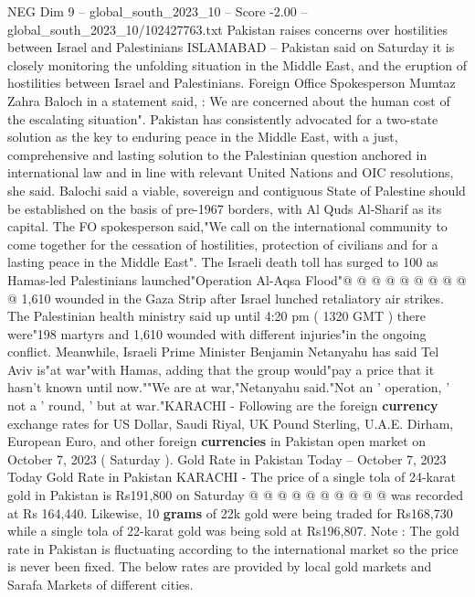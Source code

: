 \begin{textsample}{NEG Dim 9 – global\_south\_2023\_10 – Score -2.00 – global\_south\_2023\_10/102427763.txt}  \label{ex:f9_neg_418}
Pakistan raises concerns over hostilities between Israel and Palestinians ISLAMABAD -- Pakistan said on Saturday it is closely monitoring the unfolding situation in the Middle East, and the eruption of hostilities between Israel and Palestinians.
Foreign Office Spokesperson Mumtaz Zahra Baloch in a statement said, : We are concerned about the human cost of the escalating situation".
Pakistan has consistently advocated for a two-state solution as the key to enduring peace in the Middle East, with a just, comprehensive and lasting solution to the Palestinian question anchored in international law and in line with relevant United Nations and OIC resolutions, she said.
Balochi said a viable, sovereign and contiguous State of Palestine should be established on the basis of pre-1967 borders, with Al Quds Al-Sharif as its capital.
The FO spokesperson said,"We call on the international community to come together for the cessation of hostilities, protection of civilians and for a lasting peace in the Middle East".
The Israeli death toll has surged to 100 as Hamas-led Palestinians launched"Operation Al-Aqsa Flood"@ @ @ @ @ @ @ @ @ @ 1,610 wounded in the Gaza Strip after Israel lunched retaliatory air strikes.
The Palestinian health ministry said up until 4:20 pm ( 1320 GMT ) there were"198 martyrs and 1,610 wounded with different injuries"in the ongoing conflict.
Meanwhile, Israeli Prime Minister Benjamin Netanyahu has said Tel Aviv is"at war"with Hamas, adding that the group would"pay a price that it hasn't known until now.""We are at war,"Netanyahu said."Not an ' operation, ' not a ' round, ' but at war."KARACHI - Following are the foreign \textbf{currency} exchange rates for US Dollar, Saudi Riyal, UK Pound Sterling, U.A.E.
Dirham, European Euro, and other foreign \textbf{currencies} in Pakistan open market on October 7, 2023 ( Saturday ).
Gold Rate in Pakistan Today -- October 7, 2023 Today Gold Rate in Pakistan KARACHI - The price of a single tola of 24-karat gold in Pakistan is Rs191,800 on Saturday @ @ @ @ @ @ @ @ @ @ was recorded at Rs 164,440.
Likewise, 10 \textbf{grams} of 22k gold were being traded for Rs168,730 while a single tola of 22-karat gold was being sold at Rs196,807.
Note : The gold rate in Pakistan is fluctuating according to the international market so the price is never been fixed.
The below rates are provided by local gold markets and Sarafa Markets of different cities.

\end{textsample}
